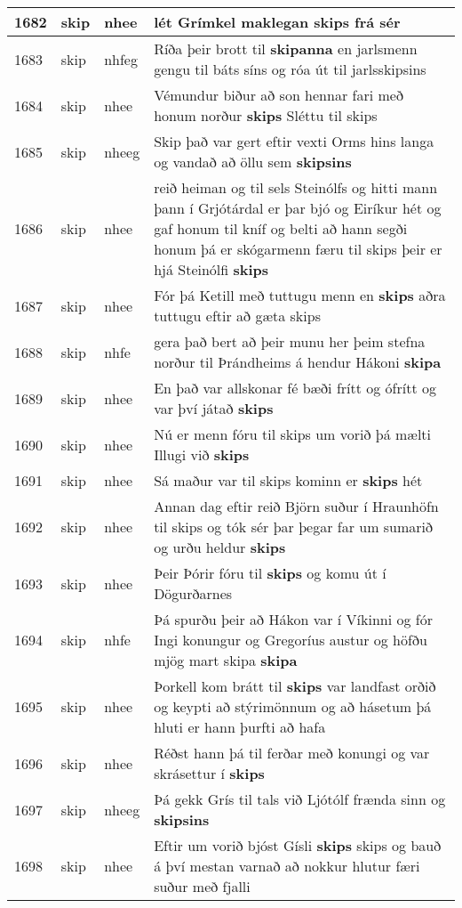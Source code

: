 \documentclass{article}
\begin{document}
\begin{longtable}{p{1cm}|p{1cm}|p{1cm}|p{13cm}}
\hline
1682&skip&nhee&lét Grímkel maklegan \textbf{skips} frá sér\\
\hline
1683&skip&nhfeg&Ríða þeir brott til \textbf{skipanna} en jarlsmenn gengu til báts síns og róa út til jarlsskipsins\\
\hline
1684&skip&nhee&Vémundur biður að son hennar fari með honum norður \textbf{skips} Sléttu til skips\\
\hline
1685&skip&nheeg&Skip það var gert eftir vexti Orms hins langa og vandað að öllu sem \textbf{skipsins} \\
\hline
1686&skip&nhee&reið heiman og til sels Steinólfs og hitti mann þann í Grjótárdal er þar bjó og Eiríkur hét og gaf honum til kníf og belti að hann segði honum þá er skógarmenn færu til skips þeir er hjá Steinólfi \textbf{skips} \\
\hline
1687&skip&nhee&Fór þá Ketill með tuttugu menn en \textbf{skips} aðra tuttugu eftir að gæta skips\\
\hline
1688&skip&nhfe&gera það bert að þeir munu her þeim stefna norður til Þrándheims á hendur Hákoni \textbf{skipa} \\
\hline
1689&skip&nhee&En það var allskonar fé bæði frítt og ófrítt og var því játað \textbf{skips} \\
\hline
1690&skip&nhee&Nú er menn fóru til skips um vorið þá mælti Illugi við \textbf{skips} \\
\hline
1691&skip&nhee&Sá maður var til skips kominn er \textbf{skips} hét\\
\hline
1692&skip&nhee&Annan dag eftir reið Björn suður í Hraunhöfn til skips og tók sér þar þegar far um sumarið og urðu heldur \textbf{skips} \\
\hline
1693&skip&nhee&Þeir Þórir fóru til \textbf{skips} og komu út í Dögurðarnes\\
\hline
1694&skip&nhfe&Þá spurðu þeir að Hákon var í Víkinni og fór Ingi konungur og Gregoríus austur og höfðu mjög mart skipa \textbf{skipa} \\
\hline
1695&skip&nhee&Þorkell kom brátt til \textbf{skips} var landfast orðið og keypti að stýrimönnum og að hásetum þá hluti er hann þurfti að hafa\\
\hline
1696&skip&nhee&Réðst hann þá til ferðar með konungi og var skrásettur í \textbf{skips} \\
\hline
1697&skip&nheeg&Þá gekk Grís til tals við Ljótólf frænda sinn og \textbf{skipsins} \\
\hline
1698&skip&nhee&Eftir um vorið bjóst Gísli \textbf{skips} skips og bauð á því mestan varnað að nokkur hlutur færi suður með fjalli\\

\end{longtable}
\end{document}
